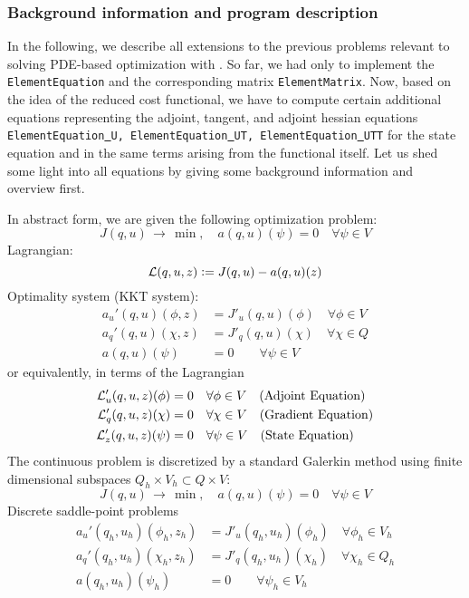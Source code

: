 {
\subsubsection{Background information and program description}
In the following, we describe all extensions to the previous problems 
relevant to solving PDE-based optimization with \dope{}. So far, 
we had only to implement the \texttt{ElementEquation} and the corresponding
matrix \texttt{ElementMatrix}. Now, based on the idea of the reduced cost
functional, we have to compute certain additional equations representing the 
adjoint, tangent, and adjoint hessian equations
\texttt{ElementEquation\underline{ }U, ElementEquation\underline{ }UT,
ElementEquation\underline{ }UTT}
for the state equation and in the same terms arising from the functional
itself. Let us shed some light into all equations by giving some background
information and overview first.

In abstract form, we are given the following optimization problem:
\begin{equation*}
J(q,u) \, \rightarrow \, \min , \quad a(q,u)(\psi) = 0 \quad \forall\psi\in V
\end{equation*}
Lagrangian:
\begin{equation*}
{\cal L}(q,u,z):=J(q,u) - a(q,u)(z)
\end{equation*}
Optimality system (KKT system):
\begin{align*}
a_u'(q,u)(\phi , z) &= J'_u(q,u)(\phi) \quad \forall \phi\in V \\
a_q'(q,u)(\chi , z) &= J'_q(q,u)(\chi) \quad \forall \chi\in Q \\
a(q,u)(\psi) &= 0 \qquad \forall\psi\in V
\end{align*}
or equivalently, in terms of the Lagrangian
\begin{align*}
{\cal L}'_u(q,u,z)(\phi) &= 0 \quad\forall \phi\in V \quad\text{(Adjoint Equation)} \\
{\cal L}'_q(q,u,z)(\chi) &= 0 \quad\forall \chi\in V \quad\text{(Gradient Equation)} \\
{\cal L}'_z(q,u,z)(\psi) &= 0 \quad\forall \psi\in V \quad\text{(State Equation)}
\end{align*}
The continuous problem is discretized by a standard Galerkin method using 
finite dimensional subspaces $Q_h \times V_h \subset Q\times V$:
\begin{equation*}
J(q,u) \, \rightarrow \, \min , \quad a(q,u)(\psi) = 0 \quad \forall\psi\in V
\end{equation*}
Discrete saddle-point problems
\begin{align*}
a_u'(q_h,u_h)(\phi_h , z_h) &= J'_u(q_h,u_h)(\phi_h) \quad \forall \phi_h\in V_h \\
a_q'(q_h,u_h)(\chi_h , z_h) &= J'_q(q_h,u_h)(\chi_h) \quad \forall \chi_h\in Q_h \\
a(q_h,u_h)(\psi_h) &= 0 \qquad \forall\psi_h\in V_h
\end{align*}
}
